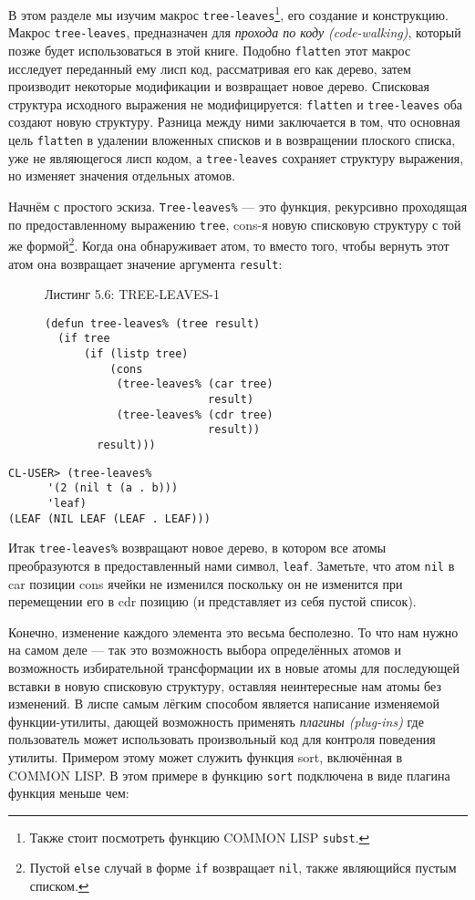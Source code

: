 В этом разделе мы изучим макрос \verb"tree-leaves"\footnote{Также стоит посмотреть функцию COMMON LISP \verb"subst".}, его создание и конструкцию. Макрос \verb"tree-leaves", предназначен для \emph{прохода по коду (code-walking)}, который позже будет использоваться в этой книге. Подобно \verb"flatten" этот макрос исследует переданный ему лисп код, рассматривая его как дерево, затем производит некоторые модификации и возвращает новое дерево. Списковая структура исходного выражения не модифицируется: \verb"flatten" и \verb"tree-leaves" оба создают новую структуру. Разница между ними заключается в том, что основная цель \verb"flatten" в удалении вложенных списков и в возвращении плоского списка, уже не являющегося лисп кодом, а \verb"tree-leaves" сохраняет структуру выражения, но изменяет значения отдельных атомов.



Начнём с простого эскиза. \verb"Tree-leaves%" --- это функция, рекурсивно проходящая по предоставленному выражению \verb"tree", cons-я новую списковую структуру с той же формой\footnote{Пустой \verb"else" случай в форме \verb"if" возвращает \verb"nil", также являющийся пустым списком.}. Когда она обнаруживает атом, то вместо того, чтобы вернуть этот атом она возвращает значение аргумента \verb"result":

\begin{figure}Листинг 5.6: TREE-LEAVES-1\label{listing_5.6}
\listbegin
\begin{verbatim}
(defun tree-leaves% (tree result)
  (if tree
      (if (listp tree)
          (cons
           (tree-leaves% (car tree)
                         result)
           (tree-leaves% (cdr tree)
                         result))
        result)))
\end{verbatim}
\listend
\end{figure}

\begin{verbatim}
CL-USER> (tree-leaves%
	  '(2 (nil t (a . b)))
	  'leaf)
(LEAF (NIL LEAF (LEAF . LEAF)))
\end{verbatim}

Итак \verb"tree-leaves%" возвращают новое дерево, в котором все атомы преобразуются в предоставленный нами символ, \verb"leaf". Заметьте, что атом \verb"nil" в car позиции cons ячейки не изменился поскольку он не изменится при перемещении его в cdr позицию (и представляет из себя пустой список).

Конечно, изменение каждого элемента это весьма бесполезно. То что нам нужно на самом деле --- так это возможность выбора определённых атомов и возможность избирательной трансформации их в новые атомы для последующей вставки в новую списковую структуру, оставляя неинтересные нам атомы без изменений. В лиспе самым лёгким способом является написание изменяемой функции-утилиты, дающей возможность применять \emph{плагины (plug-ins)} где пользователь может использовать произвольный код для контроля поведения утилиты. Примером этому может служить функция sort, включённая в COMMON LISP. В этом примере в функцию \verb"sort" подключена в виде плагина функция меньше чем:

